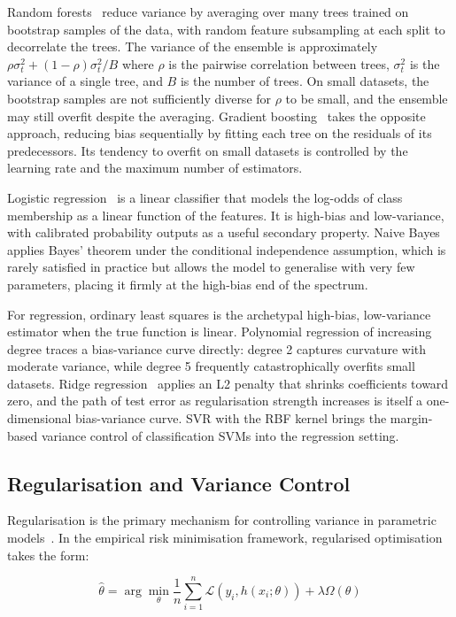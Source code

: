 \documentclass[conference]{IEEEtran}
\begin{document}
Random forests~\cite{b12} reduce variance by averaging over many trees trained on bootstrap samples of the data, with random feature subsampling at each split to decorrelate the trees. The variance of the ensemble is approximately $\rho \sigma_t^2 + (1-\rho)\sigma_t^2/B$ where $\rho$ is the pairwise correlation between trees, $\sigma_t^2$ is the variance of a single tree, and $B$ is the number of trees. On small datasets, the bootstrap samples are not sufficiently diverse for $\rho$ to be small, and the ensemble may still overfit despite the averaging. Gradient boosting~\cite{b13} takes the opposite approach, reducing bias sequentially by fitting each tree on the residuals of its predecessors. Its tendency to overfit on small datasets is controlled by the learning rate and the maximum number of estimators.

Logistic regression~\cite{b14} is a linear classifier that models the log-odds of class membership as a linear function of the features. It is high-bias and low-variance, with calibrated probability outputs as a useful secondary property. Naive Bayes applies Bayes' theorem under the conditional independence assumption, which is rarely satisfied in practice but allows the model to generalise with very few parameters, placing it firmly at the high-bias end of the spectrum.

For regression, ordinary least squares is the archetypal high-bias, low-variance estimator when the true function is linear. Polynomial regression of increasing degree traces a bias-variance curve directly: degree 2 captures curvature with moderate variance, while degree 5 frequently catastrophically overfits small datasets. Ridge regression~\cite{b14} applies an L2 penalty that shrinks coefficients toward zero, and the path of test error as regularisation strength increases is itself a one-dimensional bias-variance curve. SVR with the RBF kernel brings the margin-based variance control of classification SVMs into the regression setting.

\subsection{Regularisation and Variance Control}

Regularisation is the primary mechanism for controlling variance in parametric models~\cite{b14}. In the empirical risk minimisation framework, regularised optimisation takes the form:

\begin{equation}
\hat{\theta} = \arg\min_\theta \frac{1}{n}\sum_{i=1}^n \mathcal{L}(y_i, h(x_i; \theta)) + \lambda \Omega(\theta)
\end{equation}
\end{document}
